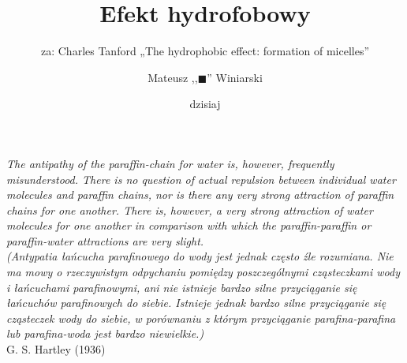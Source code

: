 \documentclass[aspectratio=1610]{beamer}
\title{Efekt hydrofobowy}
\subtitle{za: Charles Tanford „The hydrophobic effect: formation of micelles”}
\author[M. Winiarski]{Mateusz ,,\(\blacksquare\)'' Winiarski}
\institute[Seminarium magisterskie]{biofizyka, FAIS, Uniwersytet Jagielloński}
\date[dzisiaj]{dzisiaj}
\begin{document}
\frame{\titlepage}

\nocite{Tanford_1980}

\begin{frame}{}{}
  \flushright
  \emph{The antipathy of the paraffin-chain for water is, however, frequently misunderstood. There is no question of actual repulsion between individual water molecules and paraffin chains, nor is there any very strong attraction of paraffin chains for one another. There is, however, a very strong attraction of water molecules for one another in comparison with which the paraffin-paraffin or paraffin-water attractions are very slight.}
  \\[5mm]
  \emph{(Antypatia łańcucha parafinowego do wody jest jednak często źle rozumiana. Nie ma mowy o rzeczywistym odpychaniu pomiędzy poszczególnymi cząsteczkami wody i łańcuchami parafinowymi, ani nie istnieje bardzo silne przyciąganie się łańcuchów parafinowych do siebie. Istnieje jednak bardzo silne przyciąganie się cząsteczek wody do siebie, w porównaniu z którym przyciąganie parafina-parafina lub parafina-woda jest bardzo niewielkie.)}
\\[5mm]
  G. S. Hartley (1936) 
\end{frame}


\end{document}
